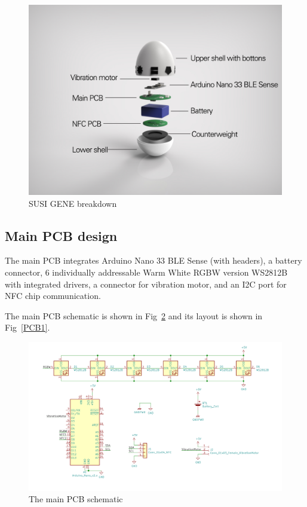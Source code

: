 \documentclass[manuscript,screen]{acmart}
\begin{document}
\begin{figure}[h]
  \centering
  \includegraphics[width=\linewidth]{Breakdown.jpg}
  \caption{SUSI GENE breakdown}
  \label{Breakdown}
\end{figure}

\subsection{Main PCB design}

The main PCB integrates Arduino Nano 33 BLE Sense (with headers), a battery connector, 6 individually addressable Warm White RGBW version WS2812B with integrated drivers, a connector for vibration motor, and an I2C port for NFC chip communication.

The main PCB schematic is shown in Fig~\ref{PCBsch1} and its layout is shown in Fig~\ref{PCB1}.

\begin{figure}[h]
  \centering
  \includegraphics[width=\linewidth]{PCBsch1.png}
  \caption{The main PCB schematic}
  \label{PCBsch1}
\end{figure}
\end{document}
